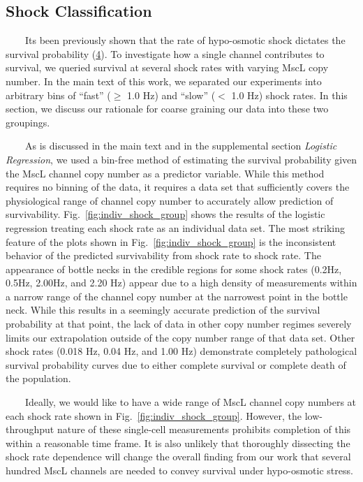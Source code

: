 \subsection{Shock
Classification}\label{shock-classification}

~~~~Its
been
previously
shown
that
the
rate
of
hypo-osmotic
shock
dictates
the
survival
probability
(\protect\hyperlink{ref-bialecka-fornal2015}{4}).
To
investigate
how a
single
channel
contributes
to
survival,
we
queried
survival
at
several
shock
rates
with
varying
MscL
copy
number.
In the
main
text
of
this
work,
we
separated
our
experiments
into
arbitrary
bins
of
``fast''
(\(\geq\)
1.0
Hz)
and
``slow''
(\(<\)
1.0
Hz)
shock
rates.
In
this
section,
we
discuss
our
rationale
for
coarse
graining
our
data
into
these
two
groupings.

~~~~As
is
discussed
in the
main
text
and in
the
supplemental
section
\emph{Logistic
Regression},
we
used a
bin-free
method
of
estimating
the
survival
probability
given
the
MscL
channel
copy
number
as a
predictor
variable.
While
this
method
requires
no
binning
of the
data,
it
requires
a data
set
that
sufficiently
covers
the
physiological
range
of
channel
copy
number
to
accurately
allow
prediction
of
survivability.
Fig.~\ref{fig:indiv_shock_group}
shows
the
results
of the
logistic
regression
treating
each
shock
rate
as an
individual
data
set.
The
most
striking
feature
of the
plots
shown
in
Fig.~\ref{fig:indiv_shock_group}
is the
inconsistent
behavior
of the
predicted
survivability
from
shock
rate
to
shock
rate.
The
appearance
of
bottle
necks
in the
credible
regions
for
some
shock
rates
(0.2Hz,
0.5Hz,
2.00Hz,
and
2.20
Hz)
appear
due to
a high
density
of
measurements
within
a
narrow
range
of the
channel
copy
number
at the
narrowest
point
in the
bottle
neck.
While
this
results
in a
seemingly
accurate
prediction
of the
survival
probability
at
that
point,
the
lack
of
data
in
other
copy
number
regimes
severely
limits
our
extrapolation
outside
of the
copy
number
range
of
that
data
set.
Other
shock
rates
(0.018
Hz,
0.04
Hz,
and
1.00
Hz)
demonstrate
completely
pathological
survival
probability
curves
due to
either
complete
survival
or
complete
death
of the
population.

~~~~Ideally,
we
would
like
to
have a
wide
range
of
MscL
channel
copy
numbers
at
each
shock
rate
shown
in
Fig.~\ref{fig:indiv_shock_group}.
However,
the
low-throughput
nature
of
these
single-cell
measurements
prohibits
completion
of
this
within
a
reasonable
time
frame.
It is
also
unlikely
that
thoroughly
dissecting
the
shock
rate
dependence
will
change
the
overall
finding
from
our
work
that
several
hundred
MscL
channels
are
needed
to
convey
survival
under
hypo-osmotic
stress.


